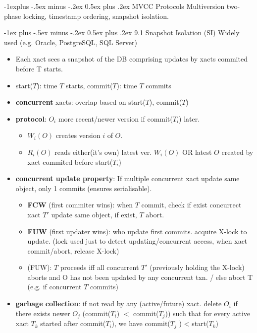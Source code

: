 \documentclass[10pt, landscape]{article}
\makeatletter
\renewcommand{\section}{\@startsection{section}{1}{0mm}%
                                {-1ex plus -.5ex minus -.2ex}%
                                {0.5ex plus .2ex}%
                                {\normalfont\large\bfseries}}
\renewcommand{\subsection}{\@startsection{subsection}{2}{0mm}%
                                {-1explus -.5ex minus -.2ex}%
                                {0.5ex plus .2ex}%
                                {\normalfont\normalsize\bfseries}}
\makeatother
\begin{document}
\begin{multicols*}{3}
\subsection{MVCC Protocols}
Multiversion two-phase locking, timestamp ordering, snapshot isolation.

\section{9.1 Snapshot Isolation (SI)}
Widely used (e.g. Oracle, PostgreSQL, SQL Server)
\begin{itemize}
\item Each xact sees a snapshot of the DB comprising updates by xacts commited before T starts.
\item start($T$): time $T$ starts, commit($T$): time $T$ commits
\item \textbf{concurrent} xacts: overlap based on start($T$), commit($T$)
\item \textbf{protocol}: $O_i$ more recent/newer version if commit($T_i$) later.
	\begin{itemize}
	\item $W_i(O)$ creates version $i$ of $O$.
	\item $R_i(O)$ reads either(it's own) latest ver. $W_i(O)$ OR latest $O$ created by xact commited before start($T_i$)
	\end{itemize}
\item \textbf{concurrent update property}: If multiple concurrent xact update same object, only 1 commits (ensures serialisable).
	\begin{itemize}
	\item \textbf{FCW} (first commiter wins): when $T$ commit, check if exist concurrect xact $T'$ update same object, if exist, $T$ abort.
	\item \textbf{FUW} (first updater wins): who update first commits. acquire X-lock to update. (lock used just to detect updating/concurrent access, when xact commit/abort, release X-lock)
	\item (FUW): $T$ proceeds iff all concurrent $T'$ (previously holding the X-lock) aborts and O has not been updated by any concurrent txn. / else abort T (e.g. if concurrent $T$ commits)
	\end{itemize}
\item \textbf{garbage collection}: if not read by any (active/future) xact. delete $O_i$ if there exists newer $O_j$ (commit($T_i$) $<$ commit($T_j$)) such that for every active xact $T_k$ started after commit($T_i$), we have commit($T_j$ ) < start($T_k$)

\end{itemize}
\end{multicols*}
\end{document}

